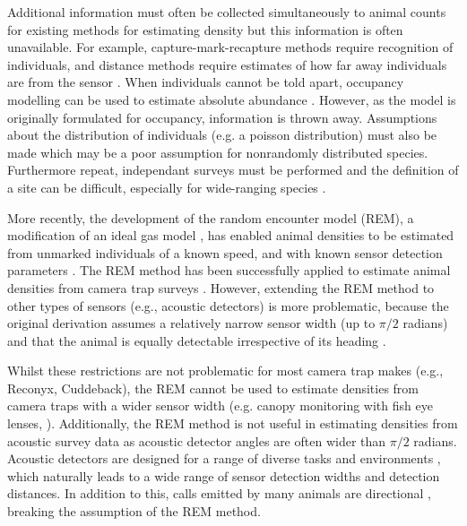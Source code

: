 \documentclass[a4paper,10pt,reqno,oneside]{amsart}
\begin{document}
Additional information must often be collected simultaneously to animal counts for existing methods for estimating density but this information is often unavailable. For example, capture-mark-recapture methods \citep{karanth1995estimating, trolle2007camera, borchers2014continuous} require recognition of individuals, and distance methods \citep{harris2013applying} require estimates of how far away individuals are from the sensor \citep{barlow2005estimates, marques2011estimating}. When individuals cannot be told apart, occupancy modelling can be used to estimate absolute abundance \citep{royle2003estimating}. However, as the model is originally formulated for occupancy, information is thrown away. Assumptions about the distribution of individuals (e.g. a poisson distribution) must also be made \citep{royle2003estimating} which may be a poor assumption for nonrandomly distributed species. Furthermore repeat, independant surveys must be performed and the definition of a site can be difficult, especially for wide-ranging species \citep{mackenzie2005designing}.

More recently, the development of the random encounter model (REM), a modification of an ideal gas model \citep{Hutchinson_Waser_2007}, has enabled animal densities to be estimated from unmarked individuals of a known speed, and with known sensor detection parameters \citep{rowcliffe2008estimating}. The REM method has been successfully applied to estimate animal densities from camera trap surveys \citep{manzo2012estimation, zero2013monitoring}. However, extending the REM method to other types of sensors (e.g., acoustic detectors) is more problematic, because the original derivation assumes a relatively narrow sensor width (up to $\pi/2$ radians) and that the animal is equally detectable irrespective of its heading \citep{rowcliffe2008estimating}. 

Whilst these restrictions are not problematic for most camera trap makes (e.g., Reconyx, Cuddeback), the REM cannot be used to estimate densities from camera traps with a wider sensor width (e.g. canopy monitoring with fish eye lenses, \citet{brusa2014increasing}). Additionally, the REM method is not useful in estimating densities from acoustic survey data as acoustic detector angles are often wider than $\pi/2$ radians.  Acoustic detectors are designed for a range of diverse tasks and environments \citep{kessel2014review}, which naturally leads to a wide range of sensor detection widths and detection distances. In addition to this, calls emitted by many animals are directional \citep{blumstein2011acoustic}, breaking the assumption of the REM method. 
\end{document}
